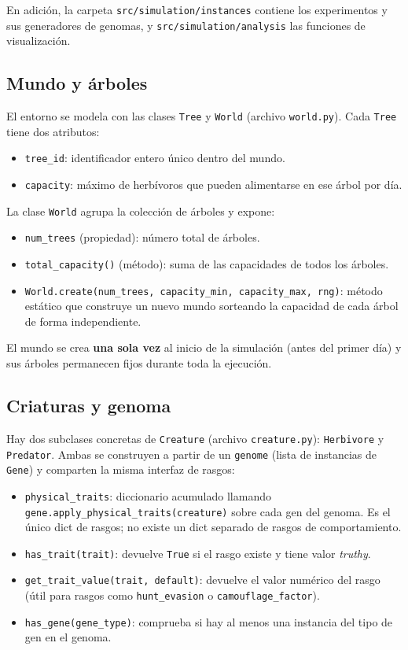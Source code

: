 \documentclass[11pt,a4paper]{article}
\begin{document}
En adici\'on, la carpeta \texttt{src/simulation/instances} contiene los experimentos y sus generadores de genomas, y \texttt{src/simulation/analysis} las funciones de visualizaci\'on.

\subsection{Mundo y \'arboles}

El entorno se modela con las clases \texttt{Tree} y \texttt{World} (archivo \texttt{world.py}).
Cada \texttt{Tree} tiene dos atributos:
\begin{itemize}
	\item \texttt{tree\_id}: identificador entero único dentro del mundo.
	\item \texttt{capacity}: m\'aximo de herb\'ivoros que pueden alimentarse en ese \'arbol por d\'ia.
\end{itemize}

La clase \texttt{World} agrupa la colección de \'arboles y expone:
\begin{itemize}
	\item \texttt{num\_trees} (propiedad): n\'umero total de \'arboles.
	\item \texttt{total\_capacity()} (m\'etodo): suma de las capacidades de todos los \'arboles.
	\item \texttt{World.create(num\_trees, capacity\_min, capacity\_max, rng)}: m\'etodo est\'atico que construye
	un nuevo mundo sorteando la capacidad de cada \'arbol de forma independiente.
\end{itemize}

El mundo se crea \textbf{una sola vez} al inicio de la simulaci\'on (antes del primer d\'ia) y sus
\'arboles permanecen fijos durante toda la ejecuci\'on.

\subsection{Criaturas y genoma}

Hay dos subclases concretas de \texttt{Creature} (archivo \texttt{creature.py}): \texttt{Herbivore} y
\texttt{Predator}. Ambas se construyen a partir de un \texttt{genome} (lista de instancias de \texttt{Gene})
y comparten la misma interfaz de rasgos:

\begin{itemize}
	\item \texttt{physical\_traits}: diccionario acumulado llamando \texttt{gene.apply\_physical\_traits(creature)}
	sobre cada gen del genoma.  Es el \'unico dict de rasgos; no existe un dict separado de rasgos de comportamiento.
	\item \texttt{has\_trait(trait)}: devuelve \texttt{True} si el rasgo existe y tiene valor \textit{truthy}.
	\item \texttt{get\_trait\_value(trait, default)}: devuelve el valor num\'erico del rasgo
	(\'util para rasgos como \texttt{hunt\_evasion} o \texttt{camouflage\_factor}).
	\item \texttt{has\_gene(gene\_type)}: comprueba si hay al menos una instancia del tipo de gen en el genoma.
\end{itemize}
\end{document}
